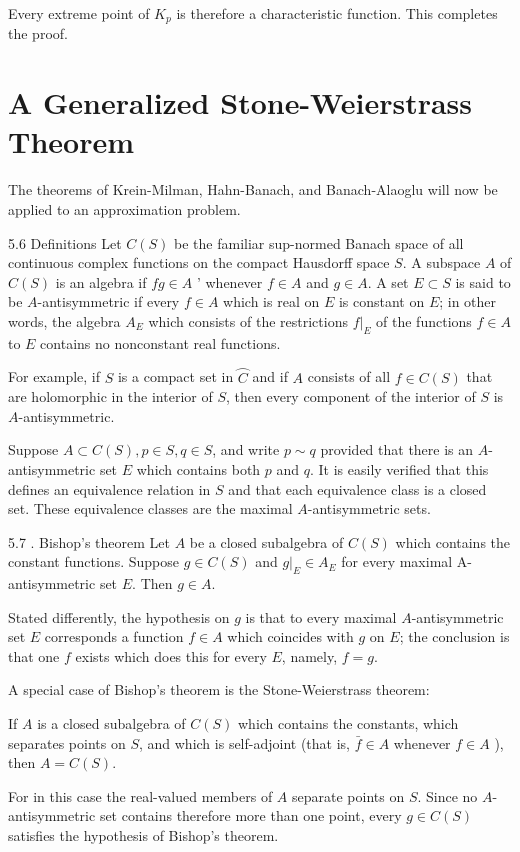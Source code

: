 \documentclass[10pt]{article}
\begin{document}
Every extreme point of $K_{p}$ is therefore a characteristic function. This completes the proof.

\section{A Generalized Stone-Weierstrass Theorem}
The theorems of Krein-Milman, Hahn-Banach, and Banach-Alaoglu will now be applied to an approximation problem.

5.6 Definitions Let $C(S)$ be the familiar sup-normed Banach space of all continuous complex functions on the compact Hausdorff space $S$. A subspace $A$ of $C(S)$ is an algebra if $f g \in A$ ' whenever $f \in A$ and $g \in A$. A set $E \subset S$ is said to be $A$-antisymmetric if every $f \in A$ which is real on $E$ is constant on $E$; in other words, the algebra $A_{E}$ which consists of the restrictions $\left.f\right|_{E}$ of the functions $f \in A$ to $E$ contains no nonconstant real functions.

For example, if $S$ is a compact set in $\overparen{C}$ and if $A$ consists of all $f \in C(S)$ that are holomorphic in the interior of $S$, then every component of the interior of $S$ is $A$-antisymmetric.

Suppose $A \subset C(S), p \in S, q \in S$, and write $p \sim q$ provided that there is an $A$-antisymmetric set $E$ which contains both $p$ and $q$. It is easily verified that this defines an equivalence relation in $S$ and that each equivalence class is a closed set. These equivalence classes are the maximal $A$-antisymmetric sets.

5.7 . Bishop's theorem Let $A$ be a closed subalgebra of $C(S)$ which contains the constant functions. Suppose $g \in C(S)$ and $\left.g\right|_{E} \in A_{E}$ for every maximal A-antisymmetric set $E$. Then $g \in A$.

Stated differently, the hypothesis on $g$ is that to every maximal $A$-antisymmetric set $E$ corresponds a function $f \in A$ which coincides with $g$ on $E$; the conclusion is that one $f$ exists which does this for every $E$, namely, $f=g$.

A special case of Bishop's theorem is the Stone-Weierstrass theorem:

If $A$ is a closed subalgebra of $C(S)$ which contains the constants, which separates points on $S$, and which is self-adjoint (that is, $\bar{f} \in A$ whenever $f \in A$ ), then $A=C(S)$.

For in this case the real-valued members of $A$ separate points on $S$. Since no $A$-antisymmetric set contains therefore more than one point, every $g \in C(S)$ satisfies the hypothesis of Bishop's theorem.
\end{document}
